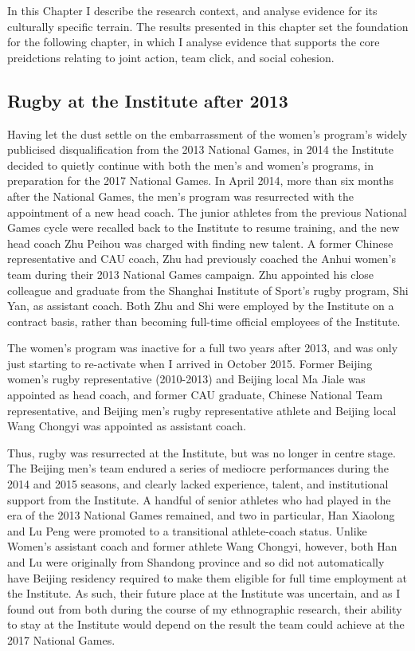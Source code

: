 \begin{CJK}{UTF8}{gbsn}
  In this Chapter I describe the research context, and analyse evidence for its culturally specific terrain.  The results presented in this chapter set the foundation for the following chapter, in which I analyse evidence that supports the core preidctions relating to joint action, team click, and social cohesion.


  \subsection{Rugby at the Institute after 2013}
  Having let the dust settle on the embarrassment of the women's program's widely publicised disqualification from the 2013 National Games, in 2014 the Institute decided to quietly continue with both the men's and women's programs, in preparation for the 2017 National Games.  In April 2014, more than six months after the National Games, the men's program was resurrected with the appointment of a new head coach. The junior athletes from the previous National Games cycle were recalled back to the Institute to resume training, and the new head coach Zhu Peihou was charged with finding new talent. A former Chinese representative and CAU coach, Zhu had previously coached the Anhui women's team during their 2013 National Games campaign.  Zhu appointed his close colleague and graduate from the Shanghai Institute of Sport's rugby program, Shi Yan, as assistant coach.  Both Zhu and Shi were employed by the Institute on a contract basis, rather than becoming full-time official employees of the Institute.

  The women's program was inactive for a full two years after 2013, and was only just starting to re-activate when I arrived in October 2015.  Former Beijing women's rugby representative (2010-2013) and Beijing local Ma Jiale was appointed as head coach, and former CAU graduate, Chinese National Team representative, and Beijing men's rugby representative athlete and Beijing local Wang Chongyi was appointed as assistant coach.

  Thus, rugby was resurrected at the Institute, but was no longer in centre stage. The Beijing men's team endured a series of mediocre performances during the 2014 and 2015 seasons, and clearly lacked experience, talent, and institutional support from the Institute.  A handful of senior athletes who had played in the era of the 2013 National Games remained, and two in particular, Han Xiaolong and Lu Peng were promoted to a transitional athlete-coach status. Unlike Women's assistant coach and former athlete Wang Chongyi, however, both Han and Lu were originally from Shandong province and so did not automatically have Beijing residency required to make them eligible for full time employment at the Institute. As such, their future place at the Institute was uncertain, and as I found out from both during the course of my ethnographic research, their ability to stay at the Institute would depend on the result the team could achieve at the 2017 National Games.


\end{CJK}
